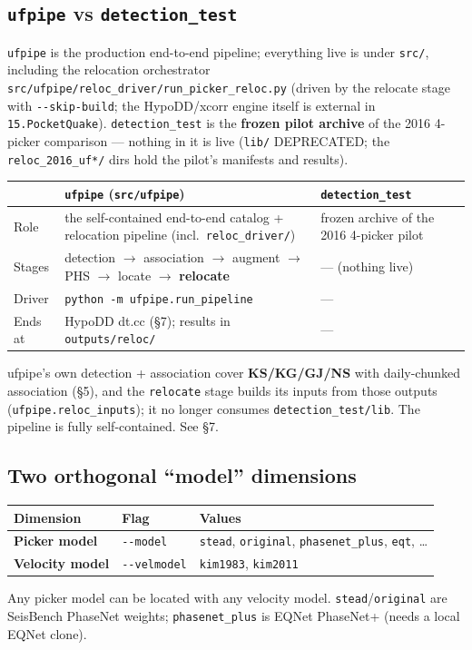 \documentclass[11pt]{article}
\newcommand{\code}[1]{\texttt{#1}}
\begin{document}
\subsection{\code{ufpipe} vs \code{detection\_test}}
\code{ufpipe} is the production end-to-end pipeline; everything live is under \code{src/}, including the
relocation orchestrator \code{src/ufpipe/reloc\_driver/run\_picker\_reloc.py} (driven by the relocate stage
with \code{-{}-skip-build}; the HypoDD/xcorr engine itself is external in \code{15.PocketQuake}).
\code{detection\_test} is the \textbf{frozen pilot archive} of the 2016 4-picker comparison — nothing in it
is live (\code{lib/} DEPRECATED; the \code{reloc\_2016\_uf*/} dirs hold the pilot's manifests and results).
\begin{center}
\small
\begin{tabular}{@{}>{\raggedright\arraybackslash}p{2.9cm}>{\raggedright\arraybackslash}p{5.6cm}>{\raggedright\arraybackslash}p{5.7cm}@{}}
\toprule
 & \textbf{\code{ufpipe}} (\code{src/ufpipe}) & \textbf{\code{detection\_test}} \\
\midrule
Role & the self-contained end-to-end catalog + relocation pipeline (incl.\ \code{reloc\_driver/}) & frozen archive of the 2016 4-picker pilot \\
Stages & detection $\rightarrow$ association $\rightarrow$ augment $\rightarrow$ PHS $\rightarrow$ locate $\rightarrow$ \textbf{relocate} & --- (nothing live) \\
Driver & \code{python -m ufpipe.run\_pipeline} & --- \\
Ends at & HypoDD dt.cc (\S7); results in \code{outputs/reloc/} & --- \\
\bottomrule
\end{tabular}
\end{center}
ufpipe's own detection + association cover \textbf{KS/KG/GJ/NS} with daily-chunked association (\S5), and the
\code{relocate} stage builds its inputs from those outputs (\code{ufpipe.reloc\_inputs}); it no longer consumes
\code{detection\_test/lib}. The pipeline is fully self-contained. See \S7.

\subsection{Two orthogonal ``model'' dimensions}
\begin{center}
\small
\begin{tabular}{@{}lll@{}}
\toprule
Dimension & Flag & Values \\
\midrule
\textbf{Picker model} & \code{-{}-model} & \code{stead}, \code{original}, \code{phasenet\_plus}, \code{eqt}, \dots \\
\textbf{Velocity model} & \code{-{}-velmodel} & \code{kim1983}, \code{kim2011} \\
\bottomrule
\end{tabular}
\end{center}
Any picker model can be located with any velocity model. \code{stead}/\code{original} are SeisBench PhaseNet
weights; \code{phasenet\_plus} is EQNet PhaseNet+ (needs a local EQNet clone).
\end{document}
